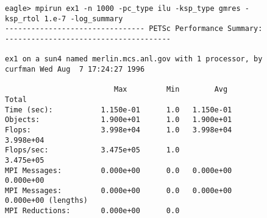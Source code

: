 \newpage
\begin{figure}[H]
{\footnotesize
\begin{verbatim}
eagle> mpirun ex1 -n 1000 -pc_type ilu -ksp_type gmres -ksp_rtol 1.e-7 -log_summary
-------------------------------- PETSc Performance Summary: --------------------------------------

ex1 on a sun4 named merlin.mcs.anl.gov with 1 processor, by curfman Wed Aug  7 17:24:27 1996

                         Max         Min        Avg        Total 
Time (sec):           1.150e-01      1.0   1.150e-01
Objects:              1.900e+01      1.0   1.900e+01
Flops:                3.998e+04      1.0   3.998e+04  3.998e+04
Flops/sec:            3.475e+05      1.0              3.475e+05
MPI Messages:         0.000e+00      0.0   0.000e+00  0.000e+00
MPI Messages:         0.000e+00      0.0   0.000e+00  0.000e+00 (lengths)
MPI Reductions:       0.000e+00      0.0


\end{verbatim}}
\end{figure}
